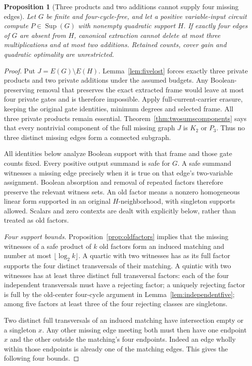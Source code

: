 \documentclass[11pt]{article}
\newcommand{\Sup}{\operatorname{Sup}}
\newtheorem{proposition}[theorem]{Proposition}
\theoremstyle{definition}
\theoremstyle{remark}
\begin{document}
\begin{proposition}[Three products and two additions cannot supply four missing edges]\label{prop:threeproductstwosums}
Let $G$ be finite and four-cycle-free, and let a positive variable-input circuit compute $P\in\Sup(G)$ with nonempty quadratic support $H$. If exactly four edges of $G$ are absent from $H$, canonical extraction cannot delete at most three multiplications and at most two additions. Retained counts, cover gain and quadratic optimality are unrestricted.
\end{proposition}
\begin{proof}
Put $J=E(G)\setminus E(H)$. Lemma~\ref{lem:fivelost} forces exactly three private products and two private additions under the assumed budgets. Any Boolean-preserving removal that preserves the exact extracted frame would leave at most four private gates and is therefore impossible. Apply full-current-carrier erasure, keeping the original gate identities, minimum degrees and selected frame. All three private products remain essential. Theorem~\ref{thm:twosumscomponents} says that every nontrivial component of the full missing graph $J$ is $K_2$ or $P_3$. Thus no three distinct missing edges form a connected subgraph.

All identities below analyze Boolean support with that frame and those gate counts fixed. Every positive output summand is safe for $G$. A safe summand witnesses a missing edge precisely when it is true on that edge's two-variable assignment. Boolean absorption and removal of repeated factors therefore preserve the relevant witness sets. An old factor means a nonzero homogeneous linear form supported in an original $H$-neighborhood, with singleton supports allowed. Scalars and zero contexts are dealt with explicitly below, rather than treated as old factors.

\emph{Four support bounds.} Proposition~\ref{prop:oldfactors} implies that the missing witnesses of a safe product of $k$ old factors form an induced matching and number at most $\lfloor\log_2 k\rfloor$. A quartic with two witnesses has as its full factor supports the four distinct transversals of their matching. A quintic with two witnesses has at least three distinct full transversal factors: each of the four independent transversals must have a rejecting factor; a uniquely rejecting factor is full by the old-center four-cycle argument in Lemma~\ref{lem:independentfive}; among five factors at least three of the four rejecting classes are singletons.

Two distinct full transversals of an induced matching have intersection empty or a singleton $x$. Any other missing edge meeting both must then have one endpoint $x$ and the other outside the matching's four endpoints. Indeed an edge wholly within those endpoints is already one of the matching edges. This gives the following four bounds.


\end{proof}
\end{document}
